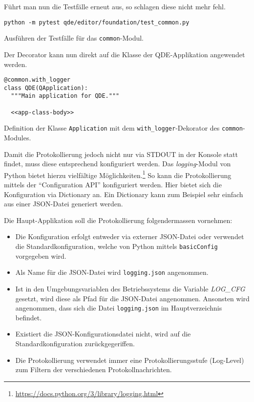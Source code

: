 \documentclass[10pt, openright, notitlepage]{scrreprt}
\begin{document}
Führt man nun die Testfälle erneut aus, so schlagen diese nicht mehr fehl.

\begin{listing}[H]
\begin{verbatim}
python -m pytest qde/editor/foundation/test_common.py
\end{verbatim}
\caption{Ausführen der Testfälle für das \texttt{common}-Modul.}
\end{listing}

Der Decorator kann nun direkt auf die Klasse der QDE-Applikation angewendet
werden.

\begin{listing}[H]
\begin{verbatim}
@common.with_logger
class QDE(QApplication):
  """Main application for QDE."""

  <<app-class-body>>
\end{verbatim}
\caption{\label{org598e769}
Definition der Klasse \texttt{Application} mit dem \texttt{with\_logger}-Dekorator des \texttt{common}-Modules.}
\end{listing}

Damit die Protokollierung jedoch nicht nur via STDOUT in der Konsole statt
findet, muss diese entsprechend konfiguriert werden. Das \emph{logging}-Modul von
Python bietet hierzu vielfältige Möglichkeiten.\footnote{\url{https://docs.python.org/3/library/logging.html}} So kann die
Protokollierung mittels der ``Configuration API'' konfiguriert werden. Hier
bietet sich die Konfiguration via Dictionary an. Ein Dictionary kann zum
Beispiel sehr einfach aus einer JSON-Datei generiert werden.

Die Haupt-Applikation soll die Protokollierung folgendermassen vornehmen:
\begin{itemize}
\item Die Konfiguration erfolgt entweder via externer JSON-Datei oder verwendet die
Standardkonfiguration, welche von Python mittels \texttt{basicConfig} vorgegeben
wird.
\item Als Name für die JSON-Datei wird \texttt{logging.json} angenommen.
\item Ist in den Umgebungsvariablen des Betriebssystems die Variable \emph{LOG\_CFG}
gesetzt, wird diese als Pfad für die JSON-Datei angenommen. Ansonsten wird
angenommen, dass sich die Datei \texttt{logging.json} im Hauptverzeichnis befindet.
\item Existiert die JSON-Konfigurationsdatei nicht, wird auf die
Standardkonfiguration zurückgegeriffen.
\item Die Protokollierung verwendet immer eine Protokollierungsstufe (Log-Level)
zum Filtern der verschiedenen Protokollnachrichten.
\end{itemize}
\end{document}
